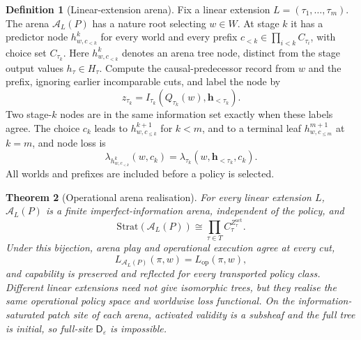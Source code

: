 \documentclass[11pt]{article}
\theoremstyle{plain}
\newtheorem{theorem}{Theorem}[section]
\theoremstyle{definition}
\newtheorem{definition}[theorem]{Definition}
\theoremstyle{remark}
\newcommand{\eps}{\varepsilon}
\begin{document}
\begin{definition}[Linear-extension arena]
\label{def:operational-arena}
Fix a linear extension $L=(\tau_1,\ldots,\tau_m)$. The arena
$\mathcal A_L(P)$ has a nature root selecting $w\in W$. At stage $k$ it has a
predictor node $h^k_{w,c_{<k}}$ for every world and every prefix
$c_{<k}\in\prod_{i<k}C_{\tau_i}$, with choice set $C_{\tau_k}$. Here
$h^k_{w,c_{<k}}$ denotes an arena tree node, distinct from the stage output
values $h_\tau\in H_\tau$. Compute the causal-predecessor record from $w$ and the prefix, ignoring earlier incomparable
cuts, and label the node by
\[
z_{\tau_k}=I_{\tau_k}(Q_{\tau_k}(w),\mathbf h_{<\tau_k}).
\]
Two stage-$k$ nodes are in the same information set exactly when these labels
agree. The choice $c_k$ leads to $h^{k+1}_{w,c_{\le k}}$ for $k<m$, and to a
terminal leaf $h^{m+1}_{w,c_{\le m}}$ at $k=m$, and node loss is
\[
\lambda_{h^k_{w,c_{<k}}}(w,c_k)
=\lambda_{\tau_k}(w,\mathbf h_{<\tau_k},c_k).
\]
All worlds and prefixes are included before a policy is selected.
\end{definition}

\begin{theorem}[Operational arena realisation]
\label{thm:operational-arena}
For every linear extension $L$, $\mathcal A_L(P)$ is a finite
imperfect-information arena, independent of the policy, and
\[
\mathrm{Strat}(\mathcal A_L(P))
\cong\prod_{\tau\in T}C_\tau^{Z_\tau^{\mathrm{act}}}.
\]
Under this bijection, arena play and operational execution agree at every cut,
\[
L_{\mathcal A_L(P)}(\pi,w)=L_{\mathrm{op}}(\pi,w),
\]
and capability is preserved and reflected for every transported policy class.
Different linear extensions need not give isomorphic trees, but they realise the
same operational policy space and worldwise loss functional. On the
information-saturated patch site of each arena, activated validity is a
subsheaf and the full tree is initial, so full-site
$\mathsf D_\eps$ is impossible.
\end{theorem}
\end{document}

